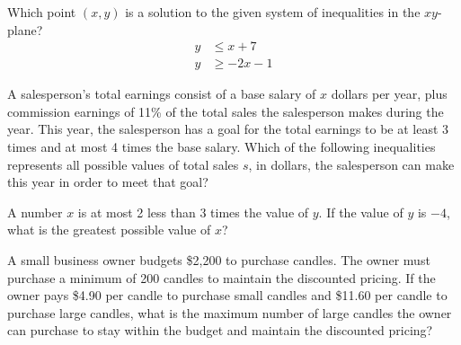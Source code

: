\vspace{1em}

Which point \( (x, y) \) is a solution to the given system of inequalities in the \( xy \)-plane?
\[
\begin{aligned}
y &\leq x + 7 \\
y &\geq -2x - 1
\end{aligned}
\]

\vspace{0.75em}


\newpage
\noindent\markforreview

\vspace{1em}

A salesperson’s total earnings consist of a base salary of \( x \) dollars per year, plus commission earnings of 11\% of the total sales the salesperson makes during the year. This year, the salesperson has a goal for the total earnings to be at least 3 times and at most 4 times the base salary. Which of the following inequalities represents all possible values of total sales \( s \), in dollars, the salesperson can make this year in order to meet that goal?

\vspace{0.75em}


\vspace{2em}

\noindent\markforreview

\vspace{1em}

A number \( x \) is at most 2 less than 3 times the value of \( y \). If the value of \( y \) is \( -4 \), what is the greatest possible value of \( x \)?


\vspace{5em}

\noindent\markforreview

\vspace{1em}

A small business owner budgets \$2{,}200 to purchase candles. The owner must purchase a minimum of 200 candles to maintain the discounted pricing. If the owner pays \$4.90 per candle to purchase small candles and \$11.60 per candle to purchase large candles, what is the maximum number of large candles the owner can purchase to stay within the budget and maintain the discounted pricing?

